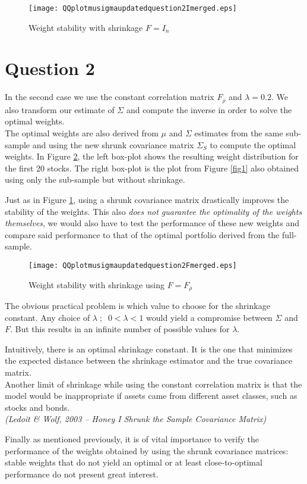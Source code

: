 \begin{figure}[H]
\texttt{[image: QQplotmusigmaupdatedquestion2Imerged.eps]}
\caption{Weight stability with shrinkage $F=I_n$}
\label{fig2}
\end{figure}

\section*{Question 2}

In the second case we use the constant correlation matrix $F_{\overline{\rho}}$ and $\lambda=0.2$. We also transform our estimate of $\Sigma$ and compute the inverse in order to solve the optimal weights. \\
The optimal weights are also derived from $\mu$ and $\Sigma$ estimates from the same sub-sample and using the new shrunk covariance matrix $\Sigma_S$ to compute the optimal weights. In Figure \ref{fig3}, the left box-plot shows the resulting weight distribution for the first 20 stocks. The right box-plot is the plot from Figure \ref{fig1} also obtained using only the sub-sample but without shrinkage. \par\smallskip
Just as in Figure \ref{fig2}, using a shrunk covariance matrix drastically improves the stability of the weights. This also \emph{does not guarantee the optimality of the weights themselves}, we would also have to test the performance of these new weights and compare said performance to that of the optimal portfolio derived from the full-sample.

\begin{figure}[H]
\texttt{[image: QQplotmusigmaupdatedquestion2Fmerged.eps]}
\caption{Weight stability with shrinkage using $F=F_{\overline{\rho}}$}
\label{fig3}
\end{figure}

The obvious practical problem is which value to choose for the shrinkage constant. Any choice of $\lambda\;;\;\;0<\lambda<1$ would yield a compromise between $\Sigma$ and $F$. But this results in an infinite number of possible values for $\lambda$. 
\par\smallskip
Intuitively, there is an optimal shrinkage constant. It is the one that minimizes the expected distance between the shrinkage estimator and the true covariance matrix. \\
Another limit of shrinkage while using the constant correlation matrix is that the model would be inappropriate if assets came from different asset classes, such as stocks and bonds. \smallskip \\
\textit{(Ledoit \& Wolf, 2003 – Honey I Shrunk the Sample Covariance Matrix)}
\par\smallskip
Finally as mentioned previously, it is of vital importance to verify the performance of the weights obtained by using the shrunk covariance matrices: stable weights that do not yield an optimal or at least close-to-optimal performance do not present great interest.